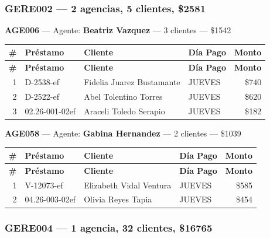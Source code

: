 \documentclass[11pt,a4paper]{article}
\newcommand{\money}[1]{\$\num{#1}}
\begin{document}
\subsubsection{GERE002 --- 2 agencias, 5 clientes, \money{2581}}

\noindent\textbf{AGE006} --- Agente: \textbf{Beatriz Vazquez} --- 3 clientes --- \money{1542}


\begin{center}
\renewcommand{\arraystretch}{1.1}
\footnotesize
\begin{longtable}{rlp{6.5cm}lr}
\toprule
\textbf{\#} & \textbf{Pr\'estamo} & \textbf{Cliente} & \textbf{D\'ia Pago} & \textbf{Monto} \\
\midrule
\endfirsthead
\toprule
\textbf{\#} & \textbf{Pr\'estamo} & \textbf{Cliente} & \textbf{D\'ia Pago} & \textbf{Monto} \\
\midrule
\endhead
1 & D-2538-ef & Fidelia Juarez Bustamante & JUEVES & \money{740} \\
2 & D-2522-ef & Abel Tolentino Torres & JUEVES & \money{620} \\
3 & 02.26-001-02ef & Araceli Toledo Serapio & JUEVES & \money{182} \\

\bottomrule
\end{longtable}
\end{center}
\noindent\textbf{AGE058} --- Agente: \textbf{Gabina Hernandez} --- 2 clientes --- \money{1039}


\begin{center}
\renewcommand{\arraystretch}{1.1}
\footnotesize
\begin{longtable}{rlp{6.5cm}lr}
\toprule
\textbf{\#} & \textbf{Pr\'estamo} & \textbf{Cliente} & \textbf{D\'ia Pago} & \textbf{Monto} \\
\midrule
\endfirsthead
\toprule
\textbf{\#} & \textbf{Pr\'estamo} & \textbf{Cliente} & \textbf{D\'ia Pago} & \textbf{Monto} \\
\midrule
\endhead
1 & V-12073-ef & Elizabeth Vidal Ventura & JUEVES & \money{585} \\
2 & 04.26-003-02ef & Olivia Reyes Tapia & JUEVES & \money{454} \\

\bottomrule
\end{longtable}
\end{center}
\subsubsection{GERE004 --- 1 agencia, 32 clientes, \money{16765}}
\end{document}
